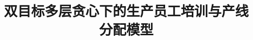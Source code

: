 \documentclass[withoutpreface,bwprint]{cumcmthesis} %
\title{双目标多层贪心下的生产员工培训与产线分配模型}
\begin{document}
    \maketitle
    \topskip
    \topmargin
	\renewcommand{\abstractname}{\Large 摘要\\}
	
	
	
	
	
    
    	
    
    
    
    
		
    
          
\end{document}
